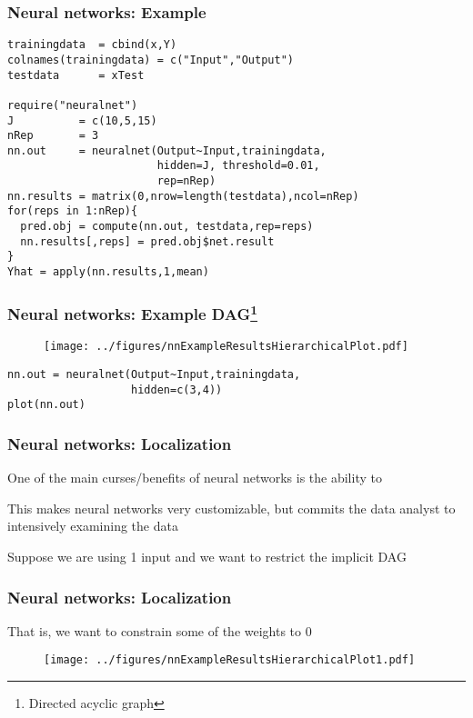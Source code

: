 \documentclass[12pt]{beamer}
\begin{document}
\begin{frame}[fragile]
\frametitle{Neural networks: Example}
\begin{verbatim}
trainingdata  = cbind(x,Y)
colnames(trainingdata) = c("Input","Output")
testdata      = xTest

require("neuralnet")
J          = c(10,5,15)
nRep       = 3
nn.out     = neuralnet(Output~Input,trainingdata, 
                       hidden=J, threshold=0.01,
                       rep=nRep)
nn.results = matrix(0,nrow=length(testdata),ncol=nRep)                       
for(reps in 1:nRep){
  pred.obj = compute(nn.out, testdata,rep=reps)
  nn.results[,reps] = pred.obj$net.result
}
Yhat = apply(nn.results,1,mean)
\end{verbatim}

\end{frame}

\begin{frame}[fragile]
\frametitle{Neural networks: Example DAG\footnote{Directed acyclic graph}}
\begin{figure}
\centering
\texttt{[image: ../figures/nnExampleResultsHierarchicalPlot.pdf]}

\end{figure}
\begin{verbatim}
nn.out = neuralnet(Output~Input,trainingdata, 
                   hidden=c(3,4))
plot(nn.out)
\end{verbatim}
\end{frame}


\begin{frame}[fragile]
\frametitle{Neural networks: Localization}
One of the main curses/benefits of neural networks is the ability to 

\vsp
This makes neural networks very customizable, but commits the data analyst to intensively examining the data

\vsp
Suppose we are using 1 input and we want to restrict the implicit DAG
\end{frame}

\begin{frame}[fragile]
\frametitle{Neural networks: Localization}
That is, we want to constrain  some of the weights to 0
\begin{figure}
\centering
\texttt{[image: ../figures/nnExampleResultsHierarchicalPlot1.pdf]}
\end{figure}

\end{frame}
\end{document}
